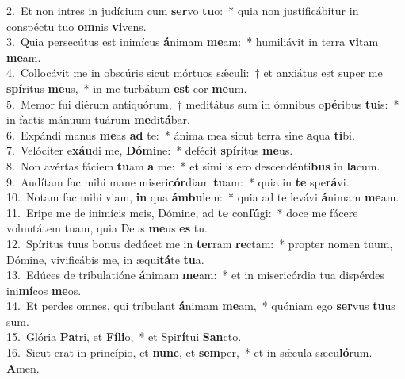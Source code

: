{2.~}Et non intres in judícium cum \textbf{ser}vo \textbf{tu}o:~* quia non justificábitur in conspéctu tuo \textbf{om}nis \textbf{vi}vens.\\
{3.~}Quia persecútus est inimícus \textbf{á}nimam \textbf{me}am:~* humiliávit in terra \textbf{vi}tam \textbf{me}am.\\
{4.~}Collocávit me in obscúris sicut mórtuos sǽculi:~† et anxiátus est super me \textbf{spí}ritus \textbf{me}us,~* in me turbátum \textbf{est} cor \textbf{me}um.\\
{5.~}Memor fui diérum antiquórum,~† meditátus sum in ómnibus o\textbf{pé}ribus \textbf{tu}is:~* in factis mánuum tuárum \textbf{me}di\textbf{tá}bar.\\
{6.~}Expándi manus \textbf{me}as \textbf{ad} te:~* ánima mea sicut terra sine \textbf{a}qua \textbf{ti}bi.\\
{7.~}Velóciter e\textbf{xáu}di me, \textbf{Dó}\textbf{mi}ne:~* defécit \textbf{spí}ritus \textbf{me}us.\\
{8.~}Non avértas fáciem \textbf{tu}am \textbf{a} me:~* et símilis ero descendénti\textbf{bus} in \textbf{la}cum.\\
{9.~}Audítam fac mihi mane miseri\textbf{cór}diam \textbf{tu}am:~* quia in \textbf{te} spe\textbf{rá}vi.\\
{10.~}Notam fac mihi viam, \textbf{in} qua \textbf{ám}\textbf{bu}lem:~* quia ad te levávi \textbf{á}nimam \textbf{me}am.\\
{11.~}Eripe me de inimícis meis, Dómine, ad \textbf{te} con\textbf{fú}gi:~* doce me fácere voluntátem tuam, quia Deus \textbf{me}us \textbf{es} tu.\\
{12.~}Spíritus tuus bonus dedúcet me in \textbf{ter}ram \textbf{re}ctam:~* propter nomen tuum, Dómine, vivificábis me, in æqui\textbf{tá}te \textbf{tu}a.\\
{13.~}Edúces de tribulatióne \textbf{á}nimam \textbf{me}am:~* et in misericórdia tua dispérdes ini\textbf{mí}cos \textbf{me}os.\\
{14.~}Et perdes omnes, qui tríbulant \textbf{á}nimam \textbf{me}am,~* quóniam ego \textbf{ser}vus \textbf{tu}us sum.\\
{15.~}Glória \textbf{Pa}tri, et \textbf{Fí}\textbf{li}o,~* et Spi\textbf{rí}tui \textbf{San}cto.\\
{16.~}Sicut erat in princípio, et \textbf{nunc}, et \textbf{sem}per,~* et in sǽcula sæcu\textbf{ló}rum. \textbf{A}men.\\
